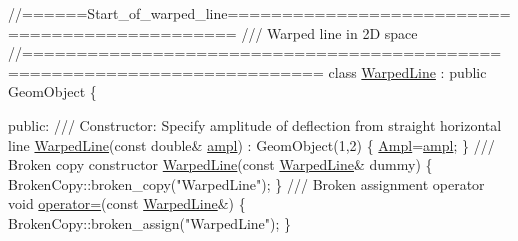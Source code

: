  
\begin{DoxyCodeInclude}
\textcolor{comment}{//======Start\_of\_warped\_line===============================================}
\textcolor{comment}{/// Warped line in 2D space}
\textcolor{comment}{}\textcolor{comment}{//=========================================================================}
\textcolor{keyword}{class }\hyperlink{classWarpedLine}{WarpedLine} : \textcolor{keyword}{public} GeomObject
\{

\textcolor{keyword}{public}:
\textcolor{comment}{}
\textcolor{comment}{ /// Constructor: Specify amplitude of deflection from straight horizontal line}
\textcolor{comment}{} \hyperlink{classWarpedLine_a9d80dca2c907b426f7130579c94f3310}{WarpedLine}(\textcolor{keyword}{const} \textcolor{keywordtype}{double}& \hyperlink{classWarpedLine_ae43c2f997b9c0de62783375341ac5794}{ampl}) : GeomObject(1,2)
  \{
   \hyperlink{classWarpedLine_ac44286e84ff213e67e0f247d00ad50af}{Ampl}=\hyperlink{classWarpedLine_ae43c2f997b9c0de62783375341ac5794}{ampl};
  \}
\textcolor{comment}{}
\textcolor{comment}{ /// Broken copy constructor}
\textcolor{comment}{} \hyperlink{classWarpedLine_a9d80dca2c907b426f7130579c94f3310}{WarpedLine}(\textcolor{keyword}{const} \hyperlink{classWarpedLine}{WarpedLine}& dummy) 
  \{ 
   BrokenCopy::broken\_copy(\textcolor{stringliteral}{"WarpedLine"});
  \} 
 \textcolor{comment}{}
\textcolor{comment}{ /// Broken assignment operator}
\textcolor{comment}{} \textcolor{keywordtype}{void} \hyperlink{classWarpedLine_ae2ee796906c0caa7e94f277f6fc499e1}{operator=}(\textcolor{keyword}{const} \hyperlink{classWarpedLine}{WarpedLine}&) 
  \{
   BrokenCopy::broken\_assign(\textcolor{stringliteral}{"WarpedLine"});
  \}


\end{DoxyCodeInclude}
